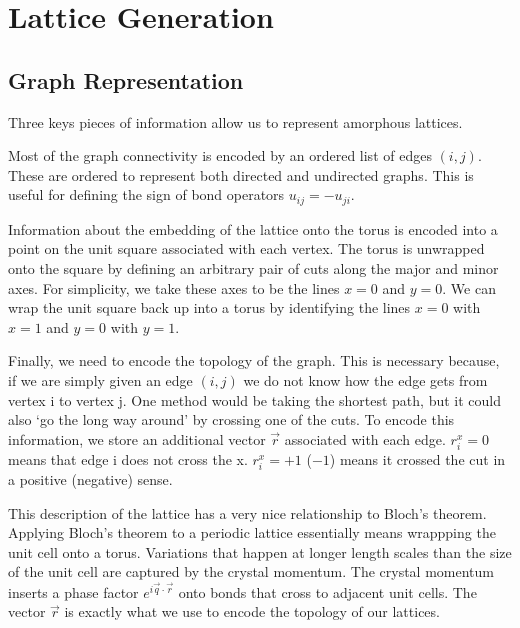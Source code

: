 \hypertarget{app-lattice-generation}{%
\section{Lattice Generation}\label{app-lattice-generation}}

\hypertarget{graph-representation}{%
\subsection{Graph Representation}\label{graph-representation}}

Three keys pieces of information allow us to represent amorphous lattices.

Most of the graph connectivity is encoded by an ordered list of edges \((i,j)\). These are ordered to represent both directed and undirected graphs. This is useful for defining the sign of bond operators \(u_{ij} = - u_{ji}\).

Information about the embedding of the lattice onto the torus is encoded into a point on the unit square associated with each vertex. The torus is unwrapped onto the square by defining an arbitrary pair of cuts along the major and minor axes. For simplicity, we take these axes to be the lines \(x = 0\) and \(y = 0\). We can wrap the unit square back up into a torus by identifying the lines \(x = 0\) with \(x = 1\) and \(y = 0\) with \(y = 1\).

Finally, we need to encode the topology of the graph. This is necessary because, if we are simply given an edge \((i, j)\) we do not know how the edge gets from vertex i to vertex j. One method would be taking the shortest path, but it could also `go the long way around' by crossing one of the cuts. To encode this information, we store an additional vector \(\vec{r}\) associated with each edge. \(r_i^x = 0\) means that edge i does not cross the x. \(r_i^x = +1\) (\(-1\)) means it crossed the cut in a positive (negative) sense.

This description of the lattice has a very nice relationship to Bloch's theorem. Applying Bloch's theorem to a periodic lattice essentially means wrappping the unit cell onto a torus. Variations that happen at longer length scales than the size of the unit cell are captured by the crystal momentum. The crystal momentum inserts a phase factor \(e^{i \vec{q}\cdot\vec{r}}\) onto bonds that cross to adjacent unit cells. The vector \(\vec{r}\) is exactly what we use to encode the topology of our lattices.

